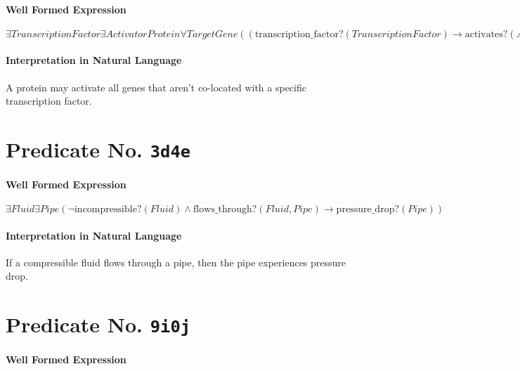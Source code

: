 \documentclass[11pt]{article}
\begin{document}
\paragraph*{Well Formed Expression}
\label{sec:orga5eb087}

\(\exists \mathit{TranscriptionFactor} \exists \mathit{ActivatorProtein} \forall \mathit{TargetGene} ((\mathrm{transcription\_factor?}(\mathit{TranscriptionFactor}) \rightarrow \mathrm{activates?}(\mathit{ActivatorProtein}, \mathit{TargetGene})) \land \neg \mathrm{co\_located?}(\mathit{TranscriptionFactor}, \mathit{TargetGene}))\)

\paragraph*{Interpretation in Natural Language}
\label{sec:org0bf9ba1}

A protein may activate all genes that aren't co-located with a specific transcription factor.



\section{Predicate No. \texttt{3d4e}}
\label{sec:org54f978f}

\paragraph*{Well Formed Expression}
\label{sec:org9f6d3fb}

\(\exists \mathit{Fluid} \exists \mathit{Pipe} (\neg \mathrm{incompressible?}(\mathit{Fluid}) \land \mathrm{flows\_through?}(\mathit{Fluid}, \mathit{Pipe}) \rightarrow \mathrm{pressure\_drop?}(\mathit{Pipe}))\)

\paragraph*{Interpretation in Natural Language}
\label{sec:org4e66cb5}

If a compressible fluid flows through a pipe, then the pipe experiences pressure drop.



\section{Predicate No. \texttt{9i0j}}
\label{sec:org0579ced}

\paragraph*{Well Formed Expression}
\label{sec:org6fbd884}
\end{document}
